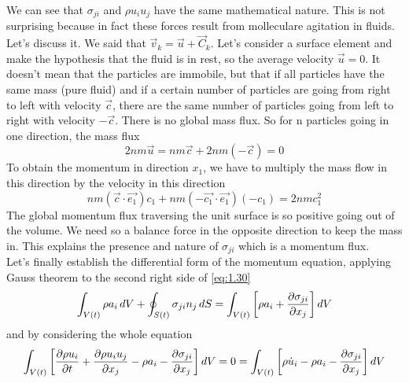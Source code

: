 		\begin{center}
		\end{center}
		We can see that $\sigma _{ji}$ and $\rho u_iu_j$ have the same mathematical nature. This is not surprising because in fact these forces result from molleculare agitation in fluids. Let's discuss it. We said that $\vec{v}_k = \vec{u} + \vec{C}_k$. Let's consider a surface element and make the hypothesis that the fluid is in rest, so the average velocity $\vec{u} = 0$. It doesn't mean that the particles are immobile, but that if all particles have the same mass (pure fluid) and if a certain number of particles are going from right to left with velocity $\vec{c}$, there are the same number of particles going from left to right with velocity $-\vec{c}$. There is no global mass flux. So for n particles going in one direction, the mass flux
		\begin{equation}
			2nm\vec{u} = nm\vec{c} + 2nm(-\vec{c}) = 0 
		\end{equation}
		To obtain the momentum in direction $x_1$, we have to multiply the mass flow in this direction by the velocity in this direction 
		\begin{equation}
			nm (\vec{c}\cdot \vec{e_1})c_1 + nm (-\vec{c_1}\cdot \vec{e_1})(-c_1) = 2nmc_1^2
		\end{equation}
		The global momentum flux traversing the unit surface is so positive going out of the volume. We need so a balance force in the opposite direction to keep the mass in. This explains the presence and nature of $\sigma _{ji}$ which is a momentum flux. \\
	Let's finally establish the differential form of the momentum equation, applying Gauss theorem to the second right side of \autoref{eq:1.30}
	\begin{equation}
		\int _{V(t)} \rho a_i\, dV + \oint _{S(t)} \sigma _{ji} n_j \, dS = \int _{V(t)} \left[ \rho a_i + \frac{\D \sigma _{ji}}{\D x_j} \right] dV
	\end{equation}
	and by considering the whole equation
	\begin{equation}
		\int _{V(t)} \left[ \frac{\D \rho u_i}{\D t} + \frac{\D \rho u_i u_j}{\D x_j} - \rho a_i - \frac{\D \sigma _{ji}}{\D x_j} \right] dV = 0 = \int _{V(t)} \left[ \rho \dot{u}_i - \rho a_i - \frac{\D \sigma _{ji}}{\D x_j} \right] dV
	\end{equation}
